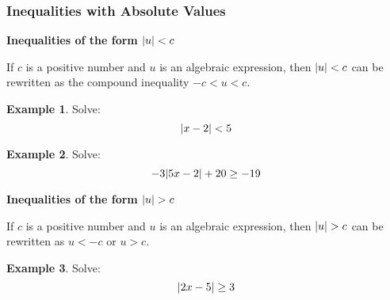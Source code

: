 \documentclass[addpoints,12pt]{exam}
\theoremstyle{definition}
\newtheorem{example}{Example}[subsection]
\begin{document}
\subsubsection*{Inequalities with Absolute Values}

\begin{mdframed}
\textbf{Inequalities of the form $\abs{u} < c$}

If $c$ is a positive number and $u$ is an algebraic expression, then $\abs{u} < c$ can be rewritten as the compound inequality $-c < u < c$.
\end{mdframed}

\begin{example}
Solve: \[ \abs{x-2} < 5\]
\vspace{1.5in}
\end{example}

\newpage

\begin{example}
Solve: \[-3\abs{5x-2} + 20 \ge -19\]
\vspace{2in}
\end{example}

\begin{mdframed}
\textbf{Inequalities of the form $\abs{u} > c$}

If $c$ is a positive number and $u$ is an algebraic expression, then $\abs{u} > c$ can be rewritten as $u < -c \text{ or } u > c$.
\end{mdframed}

\vspace{.2in}

\begin{example}
Solve: \[\abs{2x-5}\ge 3\]
\vspace{1.5in}
\end{example}
\end{document}

